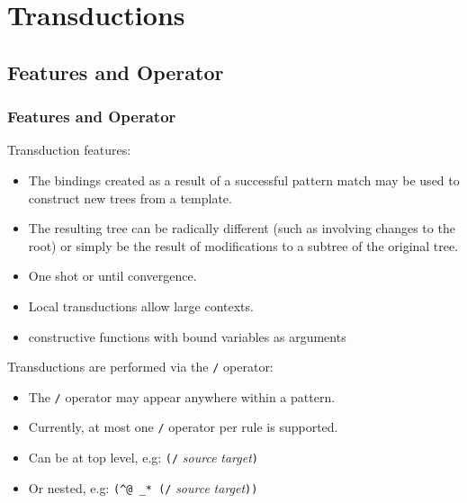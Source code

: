 \documentclass[8pt]{beamer}
\begin{document}
\section{Transductions}
\subsection{Features and Operator}
\begin{frame}
  \frametitle{Features and Operator}
  Transduction features:
  \begin{itemize}
  \item The bindings created as a result of a successful pattern match may be used to construct new trees from a template.
  \item The resulting tree can be radically different (such as involving changes to the root) or simply be the result of modifications to a subtree of the original tree. 
  \item One shot or until convergence. 
  \item Local transductions allow large contexts.
  \item constructive functions with bound variables as arguments 
  \end{itemize}

  Transductions are performed via the \texttt{/} operator:
  \begin{itemize}
  \item  The \texttt{/} operator may appear anywhere within a pattern. \\
  \item Currently, at most one \texttt{/} operator per rule is supported. 
  \item Can be at top level, e.g: \texttt{(/} \emph{source} \emph{target}\texttt{)}
  \item Or nested, e.g: \texttt{(\^{}@ \_* (/} \emph{source} \emph{target}\texttt{))}
  \end{itemize}
\end{frame}
\end{document}
